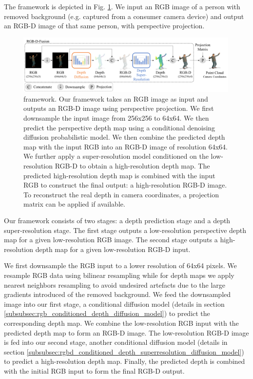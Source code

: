 The \modelname{} framework is depicted in Fig. \ref{fig:framework}. We input an RGB image of a person with removed background (e.g. captured from a consumer camera device) and output an RGB-D image of that same person, with perspective projection. 

\begin{figure}[t]
  \centering
  \includegraphics[width=0.99\textwidth]{illustrations/framework.png}
  \caption{\modelname{} framework. Our framework takes an RGB image as input and outputs an RGB-D image using perspective projection. We first downsample the input image from 256x256 to 64x64. We then predict the perspective depth map using a conditional denoising diffusion probabilistic model. We then combine the predicted depth map with the input RGB into an RGB-D image of resolution 64x64. We further apply a super-resolution model conditioned on the low-resolution RGB-D to obtain a high-resolution depth map. The predicted high-resolution depth map is combined with the input RGB to construct the final output: a high-resolution RGB-D image. To reconstruct the real depth in camera coordinates, a projection matrix can be applied if available.}
  \label{fig:framework}
\end{figure}

Our framework consists of two stages: a depth prediction stage and a depth super-resolution stage. 
The first stage outputs a low-resolution perspective depth map for a given low-resolution RGB image. The second stage outputs a high-resolution depth map for a given low-resolution RGB-D input.

We first downsample the RGB input to a lower resolution of 64x64 pixels. We resample RGB data using bilinear resampling while for depth maps we apply nearest neighbors resampling to avoid undesired artefacts due to the large gradients introduced of the removed background. We feed the downsampled image into our first stage, a conditional diffusion model (details in section \ref{subsubsec:rgb_conditioned_depth_diffusion_model}) to predict the corresponding depth map. We combine the low-resolution RGB input with the predicted depth map to form an RGB-D image. The low-resolution RGB-D image is fed into our second stage, another conditional diffusion model (details in section \ref{subsubsec:rgbd_conditioned_depth_superresolution_diffusion_model}) to predict a high-resolution depth map. Finally, the predicted depth is combined with the initial RGB input to form the final RGB-D output.

